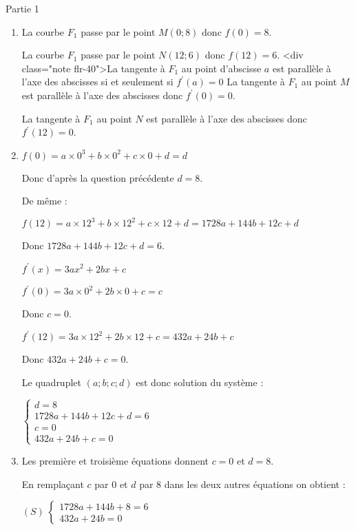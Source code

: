 \begin{corrige}
     \begin{h3}Partie 1\end{h3}
     \begin{enumerate}
          \item
          La courbe $F_1$ passe par le point $M(0;8)$ donc $f(0)=8$.
          \par
          La courbe $F_1$ passe par le point $N(12;6)$ donc $f(12)=6$.
     <div class="note flr-40">La tangente à $F_1$ au point d'abscisse $a$ est parallèle à l'axe des abscisses si et seulement si  $f ^{\prime}(a)=0$
     La tangente à $F_1$ au point $M$ est parallèle à l'axe des abscisses donc $f ^{\prime}(0)=0$.
     \par
     La tangente à $F_1$ au point $N$ est parallèle à l'axe des abscisses donc $f ^{\prime}(12)=0$.
     \item
     $f(0)=a\times 0^3+b \times 0^2+c \times 0+d=d$
     \par
     Donc d'après la question précédente $d=8$.
     \par
     De même :
     \par
     $f(12)=a\times 12^3+b \times 12^2+c \times 12+d$$=1728a+144b+12c+d$
     \par
     Donc  $1728a+144b+12c+d=6$.
     \par
     $f ^{\prime}(x)=3ax^2+2bx+c$
     \par
     $f ^{\prime}(0)=3a \times 0^2+2b \times 0+c=c$
     \par
     Donc $c=0$.
     \par
     $f ^{\prime}(12)=3a \times 12^2+2b \times 12+c=432a+24b+c$
     \par
     Donc $432a+24b+c=0$.
     \par
     Le quadruplet $(a;b;c;d)$ est donc solution du système :
     \par
     $\begin{cases}  d=8 \\ 1728a+144b+12c+d=6 \\ c=0 \\   432a+24b+c=0 \end{cases}$
     \item
     Les première et troisième équations donnent $c=0$ et $d=8$.
     \par
     En remplaçant $c$ par $0$ et $d$ par $8$ dans les deux autres équations on obtient :
     \par
     $(S) \ \begin{cases} 1728a+144b+8=6 \\ 432a+24b=0  \end{cases}$
$$
\end{enumerate}
\end{corrige}
